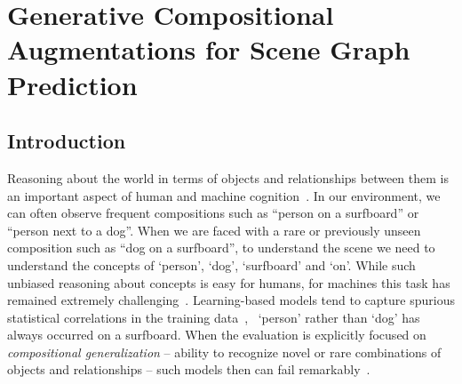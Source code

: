\graphicspath{{Ch5_2021_iccv/figs/}}

\chapter{{Generative Compositional Augmentations for Scene Graph Prediction}\label{ch:iccv2021}}



\section{Introduction\label{sec:intro}}

Reasoning about the world in terms of objects and relationships between them is an important aspect of human and machine cognition~\citep{greff2020binding}. 
In our environment, we can often observe frequent compositions such as ``person on a surfboard'' or ``person next to a dog''. When we are faced with a rare or previously unseen composition such as ``dog on a surfboard'', to understand the scene we need to understand the concepts of `person', `dog', `surfboard' and `on'. While such unbiased reasoning about concepts is easy for humans, for machines this task has remained extremely challenging~\citep{atzmon2016learning, johnson2017clevr, bahdanau2018systematic, keysers2019measuring, lake2019compositional}. 
Learning-based models tend to capture spurious statistical correlations in the training data~\citep{arjovsky2019invariant,niu2020counterfactual}, \eg~`person' rather than `dog' has always occurred on a surfboard. When the evaluation is explicitly focused on \textit{compositional generalization} -- ability to recognize novel or rare combinations of objects and relationships -- such models then can fail remarkably~\citep{atzmon2016learning, lu2016visual, tang2020unbiased, knyazev2020graph}.

